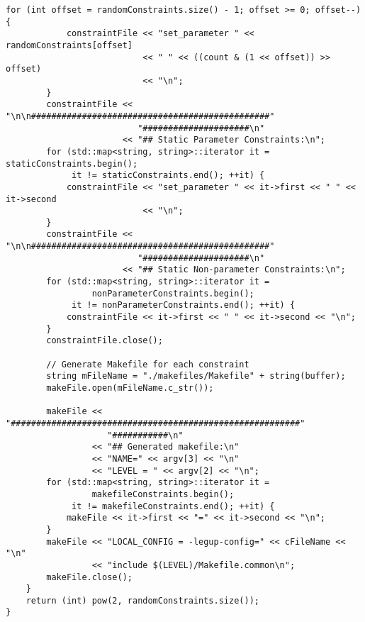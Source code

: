 \begin{lstlisting}[caption={Constraint-generation program source code},label=lst:constraintGenerating]
        for (int offset = randomConstraints.size() - 1; offset >= 0; offset--) {
            constraintFile << "set_parameter " << randomConstraints[offset]
                           << " " << ((count & (1 << offset)) >> offset)
                           << "\n";
        }
        constraintFile << "\n\n###############################################"
                          "#####################\n"
                       << "## Static Parameter Constraints:\n";
        for (std::map<string, string>::iterator it = staticConstraints.begin();
             it != staticConstraints.end(); ++it) {
            constraintFile << "set_parameter " << it->first << " " << it->second
                           << "\n";
        }
        constraintFile << "\n\n###############################################"
                          "#####################\n"
                       << "## Static Non-parameter Constraints:\n";
        for (std::map<string, string>::iterator it =
                 nonParameterConstraints.begin();
             it != nonParameterConstraints.end(); ++it) {
            constraintFile << it->first << " " << it->second << "\n";
        }
        constraintFile.close();

        // Generate Makefile for each constraint
        string mFileName = "./makefiles/Makefile" + string(buffer);
        makeFile.open(mFileName.c_str());

        makeFile << "#########################################################"
                    "###########\n"
                 << "## Generated makefile:\n"
                 << "NAME=" << argv[3] << "\n"
                 << "LEVEL = " << argv[2] << "\n";
        for (std::map<string, string>::iterator it =
                 makefileConstraints.begin();
             it != makefileConstraints.end(); ++it) {
            makeFile << it->first << "=" << it->second << "\n";
        }
        makeFile << "LOCAL_CONFIG = -legup-config=" << cFileName << "\n"
                 << "include $(LEVEL)/Makefile.common\n";
        makeFile.close();
    }
    return (int) pow(2, randomConstraints.size());
}
\end{lstlisting}

